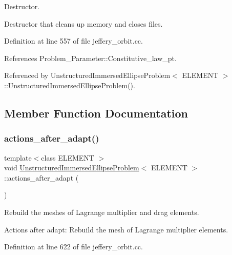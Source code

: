 Destructor. 

Destructor that cleans up memory and closes files. 

Definition at line 557 of file jeffery\+\_\+orbit.\+cc.



References Problem\+\_\+\+Parameter\+::\+Constitutive\+\_\+law\+\_\+pt.



Referenced by Unstructured\+Immersed\+Ellipse\+Problem$<$ E\+L\+E\+M\+E\+N\+T $>$\+::\+Unstructured\+Immersed\+Ellipse\+Problem().



\subsection{Member Function Documentation}
\mbox{\label{classUnstructuredImmersedEllipseProblem_ab1558b409285aea617f4abf7d3a64b3d}} 
\subsubsection{\texorpdfstring{actions\+\_\+after\+\_\+adapt()}{actions\_after\_adapt()}}
{\footnotesize\ttfamily template$<$class E\+L\+E\+M\+E\+NT $>$ \\
void \hyperlink{classUnstructuredImmersedEllipseProblem}{Unstructured\+Immersed\+Ellipse\+Problem}$<$ E\+L\+E\+M\+E\+NT $>$\+::actions\+\_\+after\+\_\+adapt (\begin{DoxyParamCaption}{ }\end{DoxyParamCaption})}



Rebuild the meshes of Lagrange multiplier and drag elements. 

Actions after adapt\+: Rebuild the mesh of Lagrange multiplier elements. 

Definition at line 622 of file jeffery\+\_\+orbit.\+cc.

\mbox{\label{classUnstructuredImmersedEllipseProblem_aa560217a33a9a9bc150fbdf15dbf1877}} 
